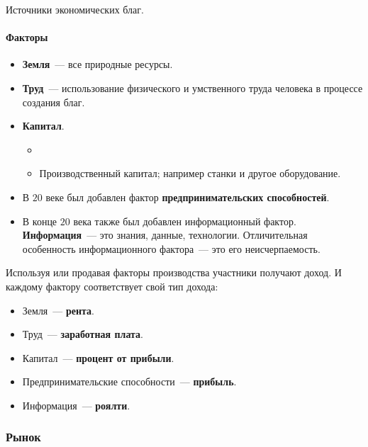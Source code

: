 \documentclass[12pt]{article}
\begin{document}
	\begin{definition}
		Источники экономических благ.
	\end{definition}
	
	\paragraph{Факторы}
	
	\begin{itemize}
		\item \textbf{Земля}~--- все природные ресурсы.
		
		\item \textbf{Труд}~--- использование физического и умственного труда человека в процессе создания благ.
		
		\item \textbf{Капитал}.
		
		\begin{itemize}
			\item 
			\item Производственный капитал; например станки и другое оборудование.
		\end{itemize}
		
		\item В $20$ веке был добавлен фактор \textbf{предпринимательских способностей}.
		
		\item В конце $20$ века также был добавлен информационный фактор. \textbf{Информация}~--- это знания, данные, технологии. Отличительная особенность информационного фактора~--- это его неисчерпаемость.
	\end{itemize}
	
	Используя или продавая факторы производства участники получают доход. И каждому фактору соответствует свой тип дохода:
	
	\begin{itemize}
		\item Земля~--- \textbf{рента}.
		\item Труд~--- \textbf{заработная плата}.
		\item Капитал~--- \textbf{процент от прибыли}.
		\item Предпринимательские способности~--- \textbf{прибыль}.
		\item Информация~--- \textbf{роялти}.
	\end{itemize}
	
	\subsubsection{Рынок}
	
\end{document}
